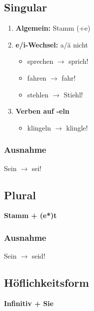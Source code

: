 \documentclass[main.tex]{subfiles}
\begin{document}
\subsection{Singular}
\begin{enumerate}
\item \textbf{Algemein:} Stamm (+e)

\item \textbf{e/i-Wechsel:} a/ä nicht
	\begin{itemize}
	\item sprechen $\rightarrow$ sprich!
	\item fahren $\rightarrow$ fahr!
	\item stehlen $\rightarrow$ Stiehl!
	\end{itemize}

\item \textbf{Verben auf -eln}
	\begin{itemize}
	\item klingeln $\rightarrow$ klingle!
	\end{itemize}
\end{enumerate}
\subsubsection{Ausnahme}
Sein $\rightarrow$ sei!
\subsection{Plural}
\textbf{Stamm + (e*)t}
\subsubsection{Ausnahme}
Sein $\rightarrow$ seid!
\subsection{Höflichkeitsform}
\textbf{Infinitiv + Sie}
\end{document}
